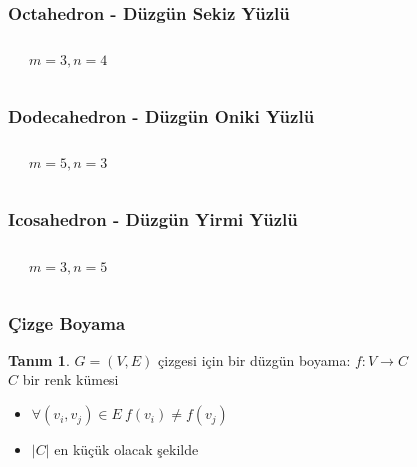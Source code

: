 \documentclass[dvipsnames]{beamer}
\theoremstyle{definition}
\newtheorem{tanim}[theorem]{Tanım}
\theoremstyle{example}
\theoremstyle{plain}
\begin{document}
\begin{frame}
  \frametitle{Octahedron - Düzgün Sekiz Yüzlü}

  \begin{columns}
    \begin{center}
    \end{center}

    \begin{center}

      $m=3, n=4$
    \end{center}
  \end{columns}
\end{frame}

\begin{frame}
  \frametitle{Dodecahedron - Düzgün Oniki Yüzlü}

  \begin{columns}
    \begin{center}
    \end{center}

    \begin{center}

      $m=5, n=3$
    \end{center}
  \end{columns}
\end{frame}

\begin{frame}
  \frametitle{Icosahedron - Düzgün Yirmi Yüzlü}

  \begin{columns}
    \begin{center}
    \end{center}

    $m=3, n=5$
  \end{columns}
\end{frame}

\begin{frame}
  \frametitle{Çizge Boyama}

  \begin{tanim}
    $G=(V,E)$ çizgesi için bir \alert{düzgün boyama}: $f: V \rightarrow C$\\
      $C$ bir renk kümesi
    \begin{itemize}
      \item $\forall (v_i,v_j) \in E~f(v_i) \neq f(v_j)$
      \item $|C|$ en küçük olacak şekilde
    \end{itemize}
  \end{tanim}
\end{frame}
\end{document}
